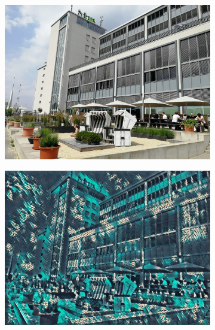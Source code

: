 \begin{figure}[H]
\begin{subfigure}[h]{0.32\textwidth}
    \end{subfigure}



    \begin{subfigure}[h]{0.32\textwidth}
        \centering
        \includegraphics[width=\textwidth]{resources/content/content/htw.jpg}
    \end{subfigure}
    \begin{subfigure}[h]{0.32\textwidth}
        \centering
        \includegraphics[width=\textwidth]{resources/content/experiments/htw-vgg16_teal_and_black_abstract_painting.jpg}
    \end{subfigure}
    \begin{subfigure}[h]{0.32\textwidth}

\end{subfigure}
\end{figure}
